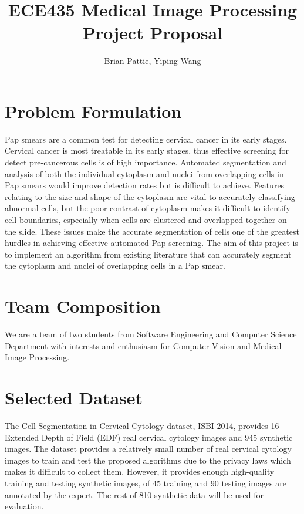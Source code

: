 \documentclass[12pt, letter]{article}
\newcommand{\courseName}{ECE435 Medical Image Processing}
\newcommand{\assignName}{Project Proposal}
\begin{document}
\pagestyle{titlesec_assignment}

\title{\courseName\\\assignName}
\author{Brian Pattie, Yiping Wang}
\maketitle



\section{Problem Formulation}

Pap smears are a common test for detecting cervical cancer in its early stages.  Cervical cancer is most treatable in its early stages, thus effective screening for detect pre-cancerous cells is of high importance.  Automated segmentation and analysis of both the individual cytoplasm and nuclei from overlapping cells in Pap smears would improve detection rates but is difficult to achieve.  Features relating to the size and shape of the cytoplasm are vital to accurately classifying abnormal cells, but the poor contrast of cytoplasm makes it difficult to identify cell boundaries, especially when cells are clustered and overlapped together on the slide.  These issues make the accurate segmentation of cells one of the greatest hurdles in achieving effective automated Pap screening.  The aim of this project is to implement an algorithm from existing literature that can accurately segment the cytoplasm and nuclei of overlapping cells in a Pap smear.

\section{Team Composition}
We are a team of two students from Software Engineering and Computer Science Department with interests and enthusiasm for Computer Vision and Medical Image Processing.

\section{Selected Dataset}
The Cell Segmentation in Cervical Cytology dataset, ISBI 2014, provides 16 Extended Depth of Field (EDF) real cervical cytology images and 945 synthetic images. The dataset provides a relatively small number of real cervical cytology images to train and test the proposed algorithms due to the privacy laws which makes it difficult to collect them. However, it provides enough high-quality training and testing synthetic images, of 45 training and 90 testing images are annotated by the expert. The rest of 810 synthetic data will be used for evaluation. 
\end{document}
